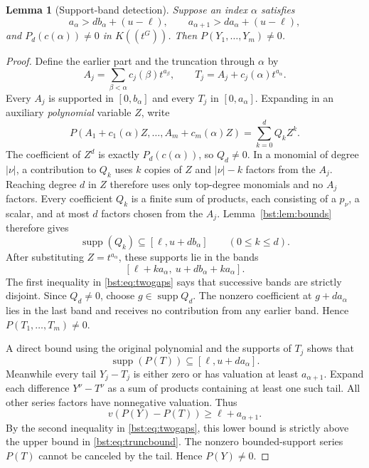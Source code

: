 \documentclass[11pt,letterpaper]{article}
\newtheorem{lemma}[theorem]{Lemma}
\theoremstyle{definition}
\theoremstyle{remark}
\newcommand{\supp}{\operatorname{supp}}
\newcommand{\HH}[2]{#1((t^{#2}))}
\begin{document}
\begin{lemma}[Support-band detection]\label{bst:lem:detection}
Suppose an index $\alpha$ satisfies
\begin{equation}\label{bst:eq:twogaps}
 a_\alpha>d b_\alpha+(u-\ell),\qquad
 a_{\alpha+1}>d a_\alpha+(u-\ell),
\end{equation}
and $P_d(c(\alpha))\ne0$ in $\HH KG$. Then $P(Y_1,\ldots,Y_m)\ne0$.
\end{lemma}
\begin{proof}
Define the earlier part and the truncation through $\alpha$ by
\[
 A_j=\sum_{\beta<\alpha}c_j(\beta)t^{a_\beta},\qquad
 T_j=A_j+c_j(\alpha)t^{a_\alpha}.
\]
Every $A_j$ is supported in $[0,b_\alpha]$ and every $T_j$ in
$[0,a_\alpha]$. Expanding in an auxiliary \emph{polynomial} variable $Z$,
write
\begin{equation}\label{bst:eq:auxpoly}
 P(A_1+c_1(\alpha)Z,\ldots,A_m+c_m(\alpha)Z)
   =\sum_{k=0}^d Q_k Z^k.
\end{equation}
The coefficient of $Z^d$ is exactly $P_d(c(\alpha))$, so $Q_d\ne0$.
In a monomial of degree $|\nu|$, a contribution to $Q_k$ uses $k$
copies of $Z$ and $|\nu|-k$ factors from the $A_j$. Reaching degree
$d$ in $Z$ therefore uses only top-degree monomials and no $A_j$ factors.
Every coefficient $Q_k$ is a finite sum of products, each consisting of
a $p_\nu$, a scalar, and at most $d$ factors chosen from the $A_j$. Lemma~\ref{bst:lem:bounds} therefore gives
\[
 \supp(Q_k)\subseteq[\ell,u+d b_\alpha]\qquad(0\le k\le d).
\]
After substituting $Z=t^{a_\alpha}$, these supports lie in the bands
\begin{equation}\label{bst:eq:bands}
 [\ell+k a_\alpha,\ u+d b_\alpha+k a_\alpha].
\end{equation}
The first inequality in \eqref{bst:eq:twogaps} says that successive bands are
strictly disjoint. Since $Q_d\ne0$, choose $g\in\supp Q_d$. The nonzero coefficient
at $g+d a_\alpha$ lies in the last band and receives no contribution
from any earlier band. Hence $P(T_1,\ldots,T_m)\ne0$.

A direct bound using the original polynomial and the supports of $T_j$
shows that
\begin{equation}\label{bst:eq:truncbound}
 \supp(P(T))\subseteq[\ell,u+d a_\alpha].
\end{equation}
Meanwhile every tail $Y_j-T_j$ is either zero or has valuation at least
$a_{\alpha+1}$. Expand each difference $Y^\nu-T^\nu$ as a sum of products
containing at least one such tail. All other series factors have
nonnegative valuation. Thus
\begin{equation}\label{bst:eq:tailbound}
 v(P(Y)-P(T))\ge\ell+a_{\alpha+1}.
\end{equation}
By the second inequality in \eqref{bst:eq:twogaps}, this lower bound is strictly
above the upper bound in \eqref{bst:eq:truncbound}. The nonzero bounded-support
series $P(T)$ cannot be canceled by the tail. Hence $P(Y)\ne0$.
\end{proof}
\end{document}
